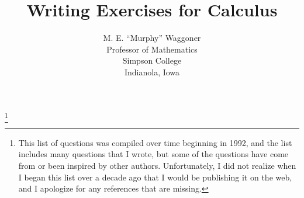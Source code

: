 \documentclass[12pt]{report}
\begin{document}

\title{Writing Exercises for Calculus}
\author{M. E. ``Murphy'' Waggoner\\
Professor of Mathematics\\
Simpson College\\
Indianola, Iowa}
\maketitle

\newpage\tableofcontents\footnote{This list of questions was compiled over time beginning in 1992, and the list includes many questions that I wrote, but some of the questions have come from or been inspired by other authors.  Unfortunately, I did not realize when I began this list over a decade ago that I would be publishing it on the web, and I apologize for any references that are missing.  } 


 
\listoffigures

 

 

 

 

 

 



 
 




 
 



%




\end{document}
